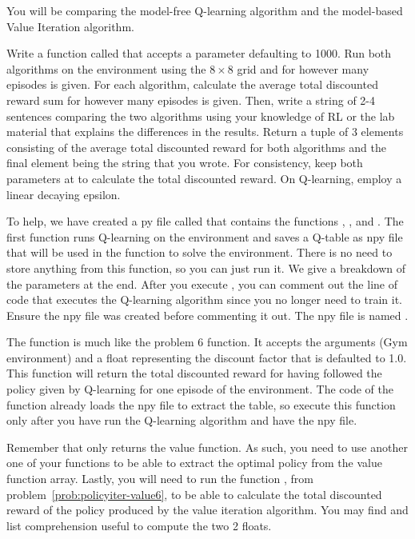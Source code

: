 \begin{problem}
\label{prob:policyiter-value7}
    You will be comparing the model-free Q-learning algorithm and the model-based Value Iteration algorithm.

    Write a function called  that accepts a parameter  defaulting to 1000.
    Run both algorithms on the  environment using the $8\times8$ grid and  for however many episodes  is given.
    For each algorithm, calculate the average total discounted reward sum for however many episodes  is given.
    Then, write a string of 2-4 sentences comparing the two algorithms using your knowledge of RL or the lab material that explains the differences in the results.
    Return a tuple of 3 elements consisting of the average total discounted reward for both algorithms and the final element being the string that you wrote.
    For consistency, keep both  parameters at  to calculate the total discounted reward.
    On Q-learning, employ a linear decaying epsilon.

    To help, we have created a py file called  that contains the functions , , and .
    The first function runs Q-learning on the  environment and saves a Q-table as npy file that will be used in the  function to solve the  environment.
    There is no need to store anything from this function, so you can just run it.
    We give a breakdown of the parameters at the end.
    After you execute , you can comment out the line of code that executes the Q-learning algorithm since you no longer need to train it.
    Ensure the npy file was created before commenting it out.
    The npy file is named .

    The  function is much like the problem 6 function.
    It accepts the arguments  (Gym environment) and  a float representing the discount factor that is defaulted to 1.0.
    This function will return the total discounted reward for having followed the policy given by Q-learning for one episode of the environment.
    The code of the function already loads the npy file to extract the table, so execute this function only after you have run the Q-learning algorithm and have the npy file.

    Remember that  only returns the value function.
    As such, you need to use another one of your functions to be able to extract the optimal policy from the value function array.
    Lastly, you will need to run the function , from problem\ \ref{prob:policyiter-value6}, to be able to calculate the total discounted reward of the policy produced by the value iteration algorithm.
    You may  find  and list comprehension useful to compute the two 2 floats.


\end{problem}
